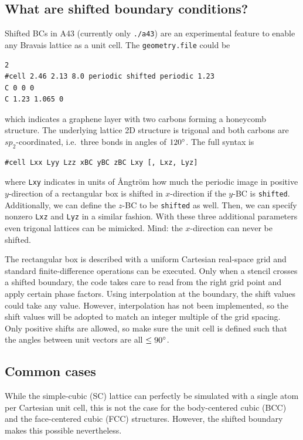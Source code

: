 \documentclass[oribibl]{llncs}
\newcommand{\ttt}[1]{\texttt{#1}}
\newcommand{\codename}{A43}
\begin{document}
\subsection{What are shifted boundary conditions?}
%
Shifted \ac{BC}s in \codename{} (currently only \ttt{./a43}) are an experimental feature
to enable any Bravais lattice as a unit cell. The \ttt{geometry.file} could be
\begin{verbatim}
2
#cell 2.46 2.13 8.0 periodic shifted periodic 1.23
C 0 0 0
C 1.23 1.065 0
\end{verbatim}
which indicates a graphene layer with two carbons forming a honeycomb structure.
The underlying lattice 2D structure is trigonal and both carbons are $sp_2$-coordinated, i.e.~three bonds in angles of $120\degree$.
The full syntax is
\begin{verbatim}
#cell Lxx Lyy Lzz xBC yBC zBC Lxy [, Lxz, Lyz]
\end{verbatim}
where \ttt{Lxy} indicates in units of \AA{}ngtr\"{o}m 
how much the periodic image in positive $y$-direction of a rectangular box
is shifted in $x$-direction if the $y$-\ac{BC} is \ttt{shifted}.
Additionally, we can define the $z$-\ac{BC} to be \ttt{shifted} as well.
Then, we can specify nonzero \ttt{Lxz} and \ttt{Lyz} in a similar fashion.
With these three additional parameters even trigonal lattices can be mimicked.
Mind: the $x$-direction can never be shifted.

The rectangular box is described with a uniform Cartesian real-space grid
and standard finite-difference operations can be executed.
Only when a stencil crosses a shifted boundary, the code takes care 
to read from the right grid point and apply certain phase factors.
Using interpolation at the boundary, the shift values could take any value.
However, interpolation has not been implemented, so the shift values will
be adopted to match an integer multiple of the grid spacing.
Only positive shifts are allowed, so make sure the unit cell is defined such that the angles between unit vectors are all $\leq 90\degree$.

\subsection{Common cases}
%
While the simple-cubic (SC) lattice can perfectly be simulated with a single atom per Cartesian unit cell,
this is not the case for the body-centered cubic (BCC) and the face-centered cubic (FCC) structures.
However, the shifted boundary makes this possible nevertheless.
%
\end{document}
